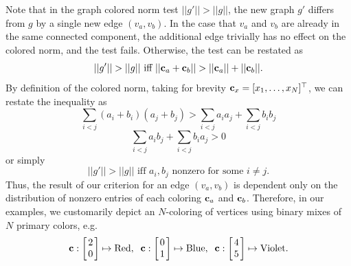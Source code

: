 Note that in the graph colored norm test
$||g'|| > ||g||$,
the new graph $g'$ differs from $g$ by a single new edge $(v_a,v_b)$.
In the case that $v_a$ and $v_b$ are already in the same connected component,
the additional edge trivially has no effect on the colored norm,
and the test fails.
Otherwise, the test can be restated as
\begin{equation}
   ||g'|| > ||g||
   \mbox{~iff~}
   ||{\bf c}_a+{\bf c}_b|| > ||{\bf c}_a|| + ||{\bf c}_b||.
\end{equation}
By definition of the colored norm,
taking for brevity ${\bf c}_x = [x_1,\dots,x_N]^\top$,
we can restate the inequality as
\begin{equation}
   \sum_{i<j} (a_i+b_i)(a_j+b_j) > \sum_{i<j} a_i a_j + \sum_{i<j} b_i b_j
\end{equation}
\begin{equation}
   \sum_{i<j} a_i b_j + \sum_{i<j} b_i a_j > 0
\end{equation}
or simply
\begin{equation}
   ||g'|| > ||g||
   \mbox{~iff~}
   a_i,b_j
   \mbox{~nonzero for some~} i \neq j.
   \label{eqn:graphnorm-wrtcolorings}
\end{equation}
Thus,
the result of our criterion for an edge $(v_a,v_b)$
is dependent only on the distribution of nonzero entries of each coloring
${\bf c}_a$ and ${\bf c}_b$.
Therefore, in our examples,
we customarily depict an $N$-coloring of vertices using
binary mixes of $N$ primary colors, e.g.
\[
   \arraycolsep=1.4pt
   {\bf c} : \left[\begin{array}{c}
      2 \\ 0 \\
   \end{array}\right]
   \mapsto
   \mbox{Red},
   \;\;
   {\bf c} : \left[\begin{array}{c}
      0 \\ 1 \\
   \end{array}\right]
   \mapsto
   \mbox{Blue},
   \;\;
   {\bf c} : \left[\begin{array}{c}
      4 \\ 5 \\
   \end{array}\right]
   \mapsto
   \mbox{Violet}.
\]

